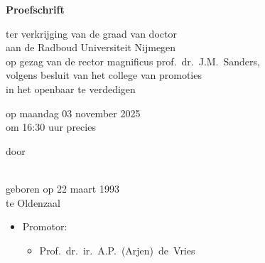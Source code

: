 \begin{titlepage}
	\begin{center}
		\vspace*{3.5cm}
		
		\huge{\bfseries\mytitle}
		
		\vspace*{15pt}
		
		
		\vspace*{5pt}
		
		\normalsize
		
		\vspace{2.0cm}
		
		\textbf{Proefschrift}
		
		\vspace{0.5cm}
		
		ter verkrijging van de graad van doctor\\
		aan de Radboud Universiteit Nijmegen\\
		op gezag van de rector magnificus
		prof.~dr.~J.M.\ Sanders,\\
		volgens besluit van het college van promoties\\
		in het openbaar te verdedigen
		
		\vspace{0.5cm}
		
		op maandag 03 november 2025\\
		\vspace{0.2cm}
		om 16:30 uur precies
		
		\vspace{0.5cm}
		
		door
		
		\vspace{0.5cm}
		
		\textbf{\myauthor}\\
		
		geboren op 22 maart 1993\\
		te Oldenzaal
	\end{center}
\end{titlepage}

\newpage%

\thispagestyle{empty}

\begin{itemize}
	\item[] Promotor:
	\begin{itemize}
		\item[] Prof.\ dr.\ ir.\ A.P.\ (Arjen)\ de\ Vries
	\end{itemize}
\end{itemize}

